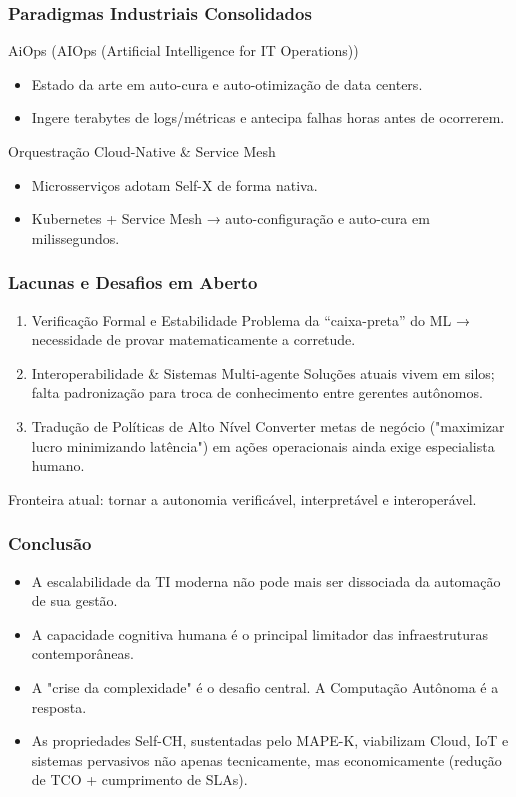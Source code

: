 \documentclass{beamer}
\begin{document}
	\begin{frame}
		\frametitle{Paradigmas Industriais Consolidados}
		AiOps (AIOps (Artificial Intelligence for IT Operations))
		\begin{itemize}
			\item Estado da arte em auto-cura e auto-otimização de data centers.
			\item Ingere terabytes de logs/métricas e antecipa falhas horas antes de ocorrerem.
		\end{itemize}
		Orquestração Cloud-Native \& Service Mesh
		\begin{itemize}
			\item Microsserviços adotam Self-X de forma nativa.
			\item Kubernetes + Service Mesh → auto-configuração e auto-cura em milissegundos.
		\end{itemize}
	\end{frame}
	
	\begin{frame}
		\frametitle{Lacunas e Desafios em Aberto}
		\begin{enumerate}
			\item Verificação Formal e Estabilidade
			Problema da ``caixa-preta'' do ML → necessidade de provar matematicamente a corretude.
			
			\item Interoperabilidade \& Sistemas Multi-agente
			Soluções atuais vivem em silos; falta padronização para troca de conhecimento entre gerentes autônomos.
			
			\item Tradução de Políticas de Alto Nível
			Converter metas de negócio ("maximizar lucro minimizando latência") em ações operacionais ainda exige especialista humano.
		\end{enumerate}
		
		Fronteira atual: tornar a autonomia verificável, interpretável e interoperável.
	\end{frame}
	
	\begin{frame}
		\frametitle{Conclusão}
		\begin{itemize}
			\item A escalabilidade da TI moderna não pode mais ser dissociada da automação de sua gestão.
			\item A capacidade cognitiva humana é o principal limitador das infraestruturas contemporâneas.
			\item A "crise da complexidade" é o desafio central. A Computação Autônoma é a resposta.
			\item As propriedades Self-CH, sustentadas pelo MAPE-K, viabilizam Cloud, IoT e sistemas pervasivos não apenas tecnicamente, mas economicamente (redução de TCO + cumprimento de SLAs).
		\end{itemize}
	\end{frame}
	
\end{document}
